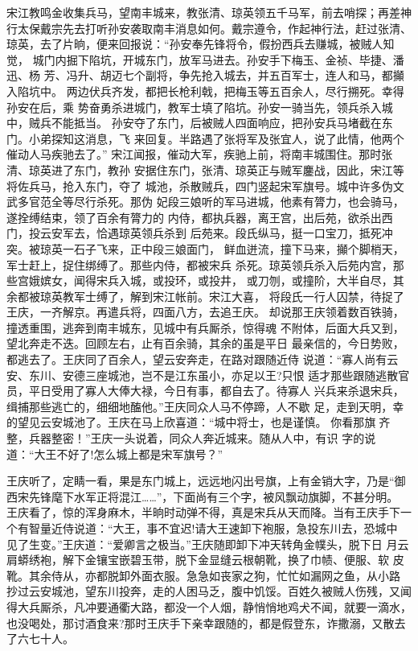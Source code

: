 宋江教鸣金收集兵马，望南丰城来，教张清、琼英领五千马军，前去哨探；再差神
行太保戴宗先去打听孙安袭取南丰消息如何。戴宗遵令，作起神行法，赶过张清、
琼英，去了片晌，便来回报说：“孙安奉先锋将令，假扮西兵去赚城，被贼人知觉，
城门内掘下陷坑，开城东门，放军马进去。孙安手下梅玉、金祯、毕捷、潘迅、杨
芳、冯升、胡迈七个副将，争先抢入城去，并五百军士，连人和马，都攧入陷坑中。
两边伏兵齐发，都把长枪利戟，把梅玉等五百余人，尽行搠死。幸得孙安在后，乘
势奋勇杀进城门，教军士填了陷坑。孙安一骑当先，领兵杀入城中，贼兵不能抵当。
孙安夺了东门，后被贼人四面响应，把孙安兵马堵截在东门。小弟探知这消息，飞
来回复。半路遇了张将军及张宜人，说了此情，他两个催动人马疾驰去了。”
宋江闻报，催动大军，疾驰上前，将南丰城围住。那时张清、琼英进了东门，教孙
安据住东门，张清、琼英正与贼军鏖战，因此，宋江等将佐兵马，抢入东门，夺了
城池，杀散贼兵，四门竖起宋军旗号。城中许多伪文武多官范全等尽行杀死。那伪
妃段三娘听的军马进城，他素有膂力，也会骑马，遂拴缚结束，领了百余有膂力的
内侍，都执兵器，离王宫，出后苑，欲杀出西门，投云安军去，恰遇琼英领兵杀到
后苑来。段氏纵马，挺一口宝刀，抵死冲突。被琼英一石子飞来，正中段三娘面门，
鲜血迸流，撞下马来，攧个脚梢天，军士赶上，捉住绑缚了。那些内侍，都被宋兵
杀死。琼英领兵杀入后苑内宫，那些宫娥嫔女，闻得宋兵入城，或投环，或投井，
或刀刎，或撞阶，大半自尽，其余都被琼英教军士缚了，解到宋江帐前。宋江大喜，
将段氏一行人囚禁，待捉了王庆，一齐解京。再遣兵将，四面八方，去追王庆。
却说那王庆领着数百铁骑，撞透重围，逃奔到南丰城东，见城中有兵厮杀，惊得魂
不附体，后面大兵又到，望北奔走不迭。回顾左右，止有百余骑，其余的虽是平日
最亲信的，今日势败，都逃去了。王庆同了百余人，望云安奔走，在路对跟随近侍
说道：“寡人尚有云安、东川、安德三座城池，岂不是江东虽小，亦足以王?只恨
适才那些跟随逃散官员，平日受用了寡人大俸大禄，今日有事，都自去了。待寡人
兴兵来杀退宋兵，缉捕那些逃亡的，细细地醢他。”王庆同众人马不停蹄，人不歇
足，走到天明，幸的望见云安城池了。王庆在马上欣喜道：“城中将士，也是谨慎。
你看那旗齐整，兵器整密！”王庆一头说着，同众人奔近城来。随从人中，有识
字的说道：“大王不好了!怎么城上都是宋军旗号？”

王庆听了，定睛一看，果是东门城上，远远地闪出号旗，上有金销大字，乃是“御
西宋先锋麾下水军正将混江……”，下面尚有三个字，被风飘动旗脚，不甚分明。
王庆看了，惊的浑身麻木，半晌时动弹不得，真是宋兵从天而降。当有王庆手下一
个有智量近侍说道：“大王，事不宜迟!请大王速卸下袍服，急投东川去，恐城中
见了生变。”王庆道：“爱卿言之极当。”王庆随即卸下冲天转角金幞头，脱下日
月云肩蟒绣袍，解下金镶宝嵌碧玉带，脱下金显缝云根朝靴，换了巾帻、便服、软
皮靴。其余侍从，亦都脱卸外面衣服。急急如丧家之狗，忙忙如漏网之鱼，从小路
抄过云安城池，望东川投奔，走的人困马乏，腹中饥馁。百姓久被贼人伤残，又闻
得大兵厮杀，凡冲要通衢大路，都没一个人烟，静悄悄地鸡犬不闻，就要一滴水，
也没喝处，那讨酒食来?那时王庆手下亲幸跟随的，都是假登东，诈撒溺，又散去
了六七十人。

